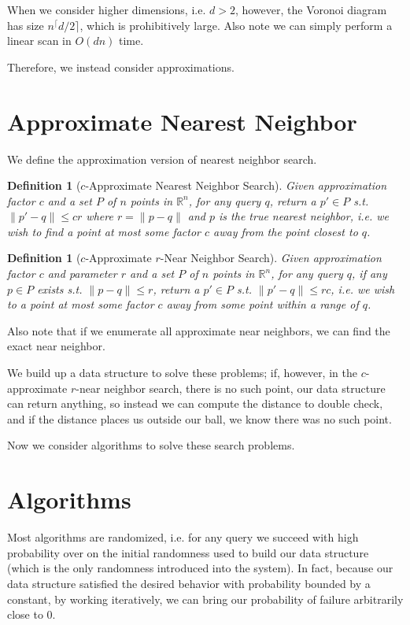 \documentclass[11pt]{article}
\newtheorem{definition}[theorem]{Definition}
\theoremstyle{definition}
\begin{document}
When we consider higher dimensions, i.e. $d > 2$, however, the Voronoi diagram  has size $n^\lceil d/2 \rceil$, which is prohibitively large. Also note we can simply perform a linear scan in $O(dn)$ time.

Therefore, we instead consider approximations.

\section{Approximate Nearest Neighbor}

We define the approximation version of nearest neighbor search.

\begin{definition}[$c$-Approximate Nearest Neighbor Search]
    Given approximation factor $c$ and a set $P$ of $n$ points in $\mathbb{R}^n$, for any query $q$, return a $p' \in P$ s.t. $\| p'-q \| \leq cr$ where $r = \| p-q \|$ and $p$ is the true nearest neighbor, i.e. we wish to find a point at most some factor $c$ away from the point closest to $q$.
\end{definition}

\begin{definition}[$c$-Approximate $r$-Near Neighbor Search]
    Given approximation factor $c$ and parameter $r$ and a set $P$ of $n$ points in $\mathbb{R}^n$, for any query $q$, if any $p \in P$ exists s.t. $\| p-q \| \leq r$, return a $p' \in P$ s.t. $\| p'-q \| \leq rc$, i.e. we wish to a point at most some factor $c$ away from some point within a range of $q$.
\end{definition}

Also note that if we enumerate all approximate near neighbors, we can find the exact near neighbor.

We build up a data structure to solve these problems; if, however, in the $c$-approximate $r$-near neighbor search, there is no such point, our data structure can return anything, so instead we can compute the distance to double check, and if the distance places us outside our ball, we know there was no such point.

Now we consider algorithms to solve these search problems.

\section{Algorithms}

Most algorithms are randomized, i.e. for any query we succeed with high probability over on the initial randomness used to build our data structure (which is the only randomness introduced into the system). In fact, because our data structure satisfied the desired behavior with probability bounded by a constant, by working iteratively, we can bring our probability of failure arbitrarily close to 0.
\end{document}
